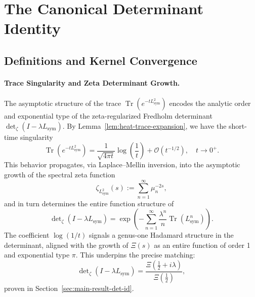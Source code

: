 \section{The Canonical Determinant Identity}
\label{sec:determinant-identity}



\subsection{Definitions and Kernel Convergence}









\paragraph{Trace Singularity and Zeta Determinant Growth.}
The asymptotic structure of the trace \(\operatorname{Tr}(e^{-tL^2_{\mathrm{sym}}})\) encodes the analytic order and exponential type of the zeta-regularized Fredholm determinant \(\det\nolimits_{\zeta}(I - \lambda L_{\mathrm{sym}})\). By Lemma~\ref{lem:heat-trace-expansion}, we have the short-time singularity
\[
\operatorname{Tr}(e^{-tL^2_{\mathrm{sym}}}) = \frac{1}{\sqrt{4\pi t}} \log\left(\frac{1}{t}\right) + \mathcal{O}(t^{-1/2}),
\quad t \to 0^+.
\]
This behavior propagates, via Laplace–Mellin inversion, into the asymptotic growth of the spectral zeta function
\[
\zeta_{L^2_{\mathrm{sym}}}(s) := \sum_{n=1}^\infty \mu_n^{-2s},
\]
and in turn determines the entire function structure of
\[
\det\nolimits_{\zeta}(I - \lambda L_{\mathrm{sym}}) = \exp\left(- \sum_{n=1}^\infty \frac{\lambda^n}{n} \operatorname{Tr}(L_{\mathrm{sym}}^n)\right).
\]
The coefficient \(\log(1/t)\) signals a genus-one Hadamard structure in the determinant, aligned with the growth of \(\Xi(s)\) as an entire function of order 1 and exponential type \(\pi\). This underpins the precise matching:
\[
\det\nolimits_{\zeta}(I - \lambda L_{\mathrm{sym}}) = \frac{\Xi(\tfrac{1}{2} + i\lambda)}{\Xi(\tfrac{1}{2})},
\]
proven in Section~\ref{sec:main-result-det-id}.

